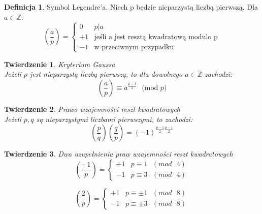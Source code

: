 \documentclass[10pt,a4paper]{article}
\theoremstyle{plain}
\newtheorem{thm}{Twierdzenie}[section]
\theoremstyle{definition}
\newtheorem{defi}{Definicja}[section]
\theoremstyle{remark}
\newcommand{\Z}{\mathbb{Z}}
\newcommand{\legendre}[2]{\genfrac{(}{)}{}{}{#1}{#2}}
\begin{document}
	\begin{defi}{Symbol Legendre'a.}
		Niech p będzie nieparzystą liczbą pierwszą. Dla $a \in \Z$:
		$$
		\legendre{a}{p} =
		\left\{ \begin{array}{ll}
		0 & p|a \\
		+1 & \textrm{jeśli a jest resztą kwadratową modulo p} \\
		-1 & \textrm{w przeciwnym przypadku}
		\end{array} \right.	
		$$
	\end{defi}
	\begin{thm}{Kryterium Gaussa}
		\\
		Jeżeli $p$ jest nieparzystą liczbą pierwszą, to dla dowolnego $a \in \Z$ zachodzi:
		$$\legendre{a}{p} \equiv a^{\frac{p-1}{2}}\textrm{ $($mod }p)$$
	\end{thm}
	\begin{thm}{Prawo wzajemności reszt kwadratowych}
		\\
		Jeżeli $p,q$ są nieparzystymi liczbami pierwszymi, to zachodzi:
		$$\legendre{p}{q}\legendre{q}{p} = (-1)^{\frac{p-1}{2}\frac{q-1}{2}}$$
	\end{thm}
	\begin{thm}{Dwa uzupełnienia praw wzajemności reszt kwadratowych}
		\\
		$$
		\legendre{-1}{p} =
		\left\{ \begin{array}{ll}
		+1 & p \equiv 1 \textrm{ }(mod\textrm{ }4) \\
		-1 & p \equiv 3 \textrm{ }(mod\textrm{ }4)
		\end{array} \right.	
		$$
		
		$$
		\legendre{2}{p} =
		\left\{ \begin{array}{ll}
		+1 & p \equiv \pm 1 \textrm{ }(mod\textrm{ }8) \\
		-1 & p \equiv \pm 3 \textrm{ }(mod\textrm{ }8)
		\end{array} \right.	
		$$	
	\end{thm}
\end{document}

